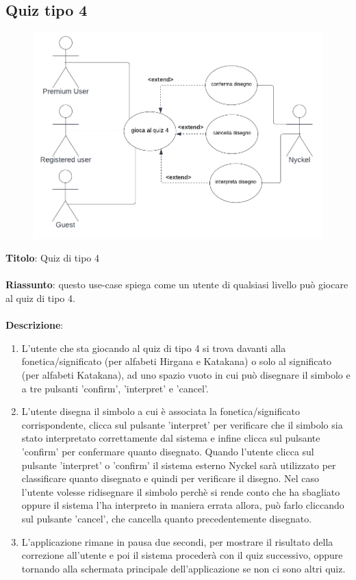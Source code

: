 \newpage
\subsection{Quiz tipo 4} \label{req_quiz_4}
\begin{figure}[!h]
\centering
\includegraphics[scale=0.35]{images/use_case_quiz_4.png}
\end{figure}
\noindent
\textbf{Titolo}: Quiz di tipo 4\\
\\
\textbf{Riassunto}: questo use-case spiega come un utente di qualsiasi livello può giocare al quiz di tipo 4.\\
\\
\textbf{Descrizione}:
\begin{enumerate}
    \item L'utente che sta giocando al quiz di tipo 4 si trova davanti alla fonetica/significato (per alfabeti Hirgana e Katakana) o solo al significato (per alfabeti Katakana), ad uno spazio vuoto in cui può disegnare il simbolo e a tre pulsanti 'confirm', 'interpret' e 'cancel'.
    \item L'utente disegna il simbolo a cui è associata la fonetica/significato corrispondente, clicca sul pulsante 'interpret' per verificare che il simbolo sia stato interpretato correttamente dal sistema e infine clicca sul pulsante 'confirm' per confermare quanto disegnato. Quando l'utente clicca sul pulsante 'interpret' o 'confirm' il sistema esterno Nyckel sarà utilizzato per classificare quanto disegnato e quindi per verificare il disegno. Nel caso l'utente volesse ridisegnare il simbolo perchè si rende conto che ha sbagliato oppure il sistema l'ha interpreto in maniera errata allora, può farlo cliccando sul pulsante 'cancel', che cancella quanto precedentemente disegnato.
    \item L'applicazione rimane in pausa due secondi, per mostrare il risultato della correzione all'utente e poi il sistema procederà con il quiz successivo, oppure tornando alla schermata principale dell'applicazione se non ci sono altri quiz.
\end{enumerate}

